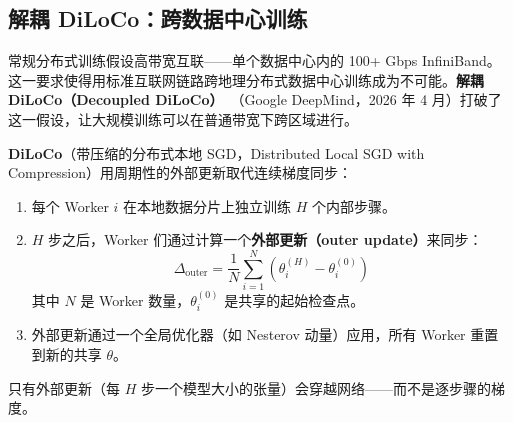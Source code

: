 \subsection{解耦 DiLoCo：跨数据中心训练}
\label{subsec:decoupled-diloco}

常规分布式训练假设高带宽互联——单个数据中心内的 100+ Gbps InfiniBand。这一要求使得用标准互联网链路跨地理分布式数据中心训练成为不可能。\textbf{解耦 DiLoCo（Decoupled DiLoCo）}~\cite{diloco2026google}（Google DeepMind，2026 年 4 月）打破了这一假设，让大规模训练可以在普通带宽下跨区域进行。

\begin{keybox}[DiLoCo：核心思想]
\textbf{DiLoCo}（带压缩的分布式本地 SGD，Distributed Local SGD with Compression）用周期性的外部更新取代连续梯度同步：
\begin{enumerate}
  \item 每个 Worker $i$ 在本地数据分片上独立训练 $H$ 个内部步骤。
  \item $H$ 步之后，Worker 们通过计算一个\textbf{外部更新（outer update）}来同步：
  \[
    \Delta_{\text{outer}} = \frac{1}{N}\sum_{i=1}^N \left(\theta_i^{(H)} - \theta_i^{(0)}\right)
  \]
  其中 $N$ 是 Worker 数量，$\theta_i^{(0)}$ 是共享的起始检查点。
  \item 外部更新通过一个全局优化器（如 Nesterov 动量）应用，所有 Worker 重置到新的共享 $\theta$。
\end{enumerate}
只有外部更新（每 $H$ 步一个模型大小的张量）会穿越网络——而不是逐步骤的梯度。
\end{keybox}

